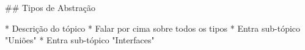 ## Tipos de Abstração

* Descrição do tópico
* Falar por cima sobre todos os tipos
* Entra sub-tópico "Uniões"
* Entra sub-tópico "Interfaces"
